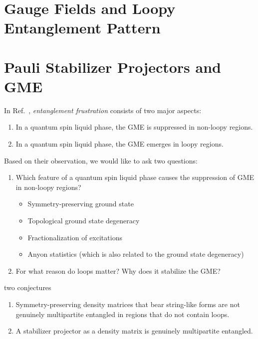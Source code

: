 \documentclass[12font]{article}
\theoremstyle{definition}
\begin{document}
\section{Gauge Fields and Loopy Entanglement Pattern}

\section{Pauli Stabilizer Projectors and GME}
In Ref.~\cite{Lyu-Chandorkar-Kapoor-Takei-Sorensen-Witczak-Krempa_2026}, \textit{entanglement frustration} consists of two major aspects:
\begin{enumerate}
    \item In a quantum spin liquid phase, the GME is suppressed in non-loopy regions.
    \item In a quantum spin liquid phase, the GME emerges in loopy regions.
\end{enumerate}
Based on their observation, we would like to ask two questions:
\begin{enumerate}
    \item Which feature of a quantum spin liquid phase causes the suppression of GME in non-loopy regions? 
    \begin{itemize}
        \item Symmetry-preserving ground state
        \item Topological ground state degeneracy
        \item Fractionalization of excitations 
        \item Anyon statistics (which is also related to the ground state degeneracy)
    \end{itemize} 
    \item For what reason do loops matter? Why does it stabilize the GME?
\end{enumerate}

two conjectures
\begin{enumerate}
    \item Symmetry-preserving density matrices that bear string-like forms are not genuinely multipartite entangled in regions that do not contain loops.

    \item A stabilizer projector as a density matrix is genuinely multipartite entangled.
\end{enumerate}
\end{document}
